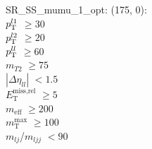 SR\_SS\_mumu\_1\_opt: (175, 0): \\
$p_{\text{T}}^{l1}$ $\geq 30$ \\
$p_{\text{T}}^{l2}$ $\geq 20$ \\
$p_{\text{T}}^{ll}$ $\geq 60$ \\
$m_{T2}$ $\geq 75$ \\
$|\Delta\eta_{ll}|$ $<1.5$ \\
$E_{\text{T}}^{\text{miss,rel}}$ $\geq 5$ \\
$m_{\text{eff}}$ $\geq 200$ \\
$m_{\text{T}}^{\text{max}}$ $\geq 100$ \\
$m_{lj}$/$m_{ljj}$ $<90$ \\
